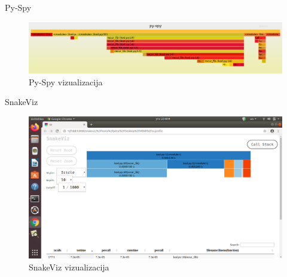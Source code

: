 \documentclass{beamer}
\begin{document}
\begin{frame}{Py-Spy}
\begin{figure}[h!]
\begin{center}
\includegraphics[scale=0.25]{MVJ_02_ProfajleriZaPython_ZecevicSmiljanicMilovanovicPopov/ps.png}
\end{center}
\caption{Py-Spy vizualizacija}
\label{fig:ps_viz}
\end{figure}
\end{frame}

\begin{frame}{SnakeViz}
\begin{figure}[h!]
\begin{center}
\includegraphics[trim={10cm 15cm 5cm 6.5cm},clip,scale=0.32]{snakeviz1.png}
\end{center}
\caption{SnakeViz vizualizacija}
\label{fig:snake_viz_1}
\end{figure}


\end{frame}
\end{document}
